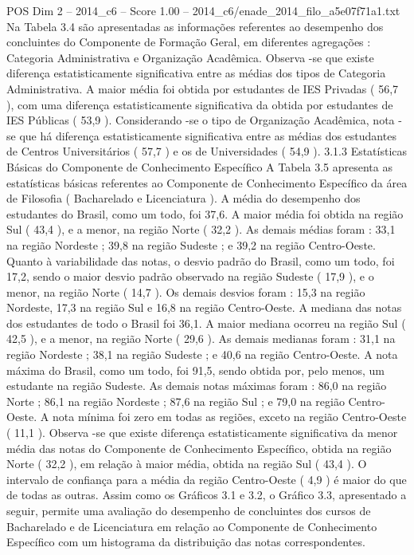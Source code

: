 \begin{textsample}{POS Dim 2 – 2014\_c6 – Score 1.00 – 2014\_c6/enade\_2014\_filo\_a5e07f71a1.txt}
Na Tabela 3.4 são apresentadas as informações referentes ao desempenho dos concluintes do Componente de Formação Geral, em diferentes agregações : Categoria Administrativa e Organização Acadêmica.
Observa -se que existe diferença estatisticamente significativa entre as médias dos tipos de Categoria Administrativa.
A maior média foi obtida por estudantes de IES Privadas ( 56,7 ), com uma diferença estatisticamente significativa da obtida por estudantes de IES Públicas ( 53,9 ).
Considerando -se o tipo de Organização Acadêmica, nota -se que há diferença estatisticamente significativa entre as médias dos estudantes de Centros Universitários ( 57,7 ) e os de Universidades ( 54,9 ). 3.1.3 Estatísticas Básicas do Componente de Conhecimento Específico A Tabela 3.5 apresenta as estatísticas básicas referentes ao Componente de Conhecimento Específico da área de Filosofia ( Bacharelado e Licenciatura ).
A média do desempenho dos estudantes do Brasil, como um todo, foi 37,6.
A maior média foi obtida na região Sul ( 43,4 ), e a menor, na região Norte ( 32,2 ).
As demais médias foram : 33,1 na região Nordeste ; 39,8 na região Sudeste ; e 39,2 na região Centro-Oeste.
Quanto à variabilidade das notas, o desvio padrão do Brasil, como um todo, foi 17,2, sendo o maior desvio padrão observado na região Sudeste ( 17,9 ), e o menor, na região Norte ( 14,7 ).
Os demais desvios foram : 15,3 na região Nordeste, 17,3 na região Sul e 16,8 na região Centro-Oeste.
A mediana das notas dos estudantes de todo o Brasil foi 36,1.
A maior mediana ocorreu na região Sul ( 42,5 ), e a menor, na região Norte ( 29,6 ).
As demais medianas foram : 31,1 na região Nordeste ; 38,1 na região Sudeste ; e 40,6 na região Centro-Oeste.
A nota máxima do Brasil, como um todo, foi 91,5, sendo obtida por, pelo menos, um estudante na região Sudeste.
As demais notas máximas foram : 86,0 na região Norte ; 86,1 na região Nordeste ; 87,6 na região Sul ; e 79,0 na região Centro-Oeste.
A nota mínima foi zero em todas as regiões, exceto na região Centro-Oeste ( 11,1 ).
Observa -se que existe diferença estatisticamente significativa da menor média das notas do Componente de Conhecimento Específico, obtida na região Norte ( 32,2 ), em relação à maior média, obtida na região Sul ( 43,4 ).
O intervalo de confiança para a média da região Centro-Oeste ( 4,9 ) é maior do que de todas as outras.
Assim como os Gráficos 3.1 e 3.2, o Gráfico 3.3, apresentado a seguir, permite uma avaliação do desempenho de concluintes dos cursos de Bacharelado e de Licenciatura em relação ao Componente de Conhecimento Específico com um histograma da distribuição das notas correspondentes.

\end{textsample}
